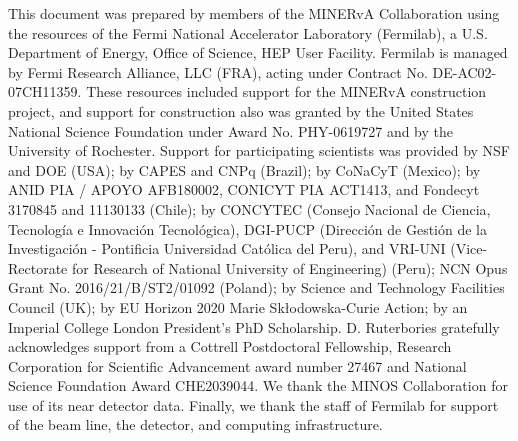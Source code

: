 \documentclass[aps,prl,twocolumn,showpacs,superscriptaddress, floatfix]{revtex4-2}  %
\begin{document}
\begin{acknowledgements}
This document was prepared by members of the MINERvA Collaboration using the resources of the Fermi National Accelerator Laboratory (Fermilab), a U.S. Department of Energy, Office of Science, HEP User Facility. Fermilab is managed by Fermi Research Alliance, LLC (FRA), acting under Contract No. DE-AC02-07CH11359.
These resources included support for the MINERvA construction project, and support
for construction also
was granted by the United States National Science Foundation under
Award No. PHY-0619727 and by the University of Rochester. Support for
participating scientists was provided by NSF and DOE (USA); by CAPES
and CNPq (Brazil); by CoNaCyT (Mexico); by  ANID PIA / APOYO AFB180002, CONICYT PIA ACT1413, and Fondecyt 3170845 and 11130133 (Chile); 
by CONCYTEC (Consejo Nacional de Ciencia, Tecnolog\'ia e Innovaci\'on Tecnol\'ogica), DGI-PUCP (Direcci\'on de Gesti\'on de la Investigaci\'on  - Pontificia Universidad Cat\'olica del Peru), and VRI-UNI (Vice-Rectorate for Research of National University of Engineering) (Peru); NCN Opus Grant No. 2016/21/B/ST2/01092 (Poland); by Science and Technology Facilities Council (UK); by EU Horizon 2020 Marie Skłodowska-Curie Action; by an Imperial College London President's PhD Scholarship. D. Ruterbories gratefully acknowledges support from a Cottrell Postdoctoral Fellowship, Research Corporation for Scientific Advancement award number 27467 and National Science Foundation Award CHE2039044.  We thank the MINOS Collaboration for use of its near detector data. Finally, we thank the staff of
Fermilab for support of the beam line, the detector, and computing infrastructure.
\end{acknowledgements}


\end{document}
